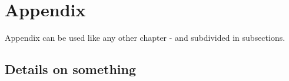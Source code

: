 \chapter{Appendix}

Appendix can be used like any other chapter - and subdivided in subsections.

\section{Details on something}
\label{sec:appdx:smth}